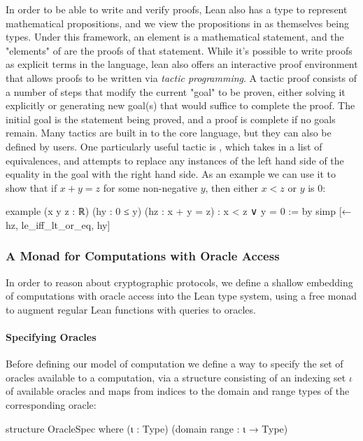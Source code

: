 In order to be able to write and verify proofs, Lean also has a type  to represent mathematical propositions, and we view the propositions in  as themselves being types.
Under this framework, an element  is a mathematical statement, and the "elements" of  are the proofs of that statement.  While it's possible to write proofs as explicit terms in the language, lean also offers an interactive proof environment that allows proofs to be written via \textit{tactic programming}.
A tactic proof consists of a number of steps that modify the current "goal" to be proven, either solving it explicitly or generating new goal(s) that would suffice to complete the proof.
The initial goal is the statement being proved, and a proof is complete if no goals remain.
Many tactics are built in to the core language, but they can also be defined by users.
One particularly useful tactic is , which takes in a list of equivalences, and attempts to replace any instances of the left hand side of the equality in the goal with the right hand side. 
As an example we can use it to show that if $x + y = z$ for some non-negative $y$, then either $x < z$ or $y$ is $0$:

\begin{leancode}
  example (x y z : ℝ) (hy : 0 ≤ y)
      (hz : x + y = z) : x < z ∨ y = 0 :=
    by simp [← hz, le_iff_lt_or_eq, hy]
\end{leancode}

\subsubsection{A Monad for Computations with Oracle Access} \label{OracleComp}
In order to reason about cryptographic protocols, we define a shallow embedding of computations with oracle access into the Lean type system, using a free monad to augment regular Lean functions with queries to oracles.

\paragraph{Specifying Oracles}
Before defining our model of computation we define a way to specify the set of oracles available to a computation, via a structure  consisting of an indexing set $\iota$ of available oracles and maps from indices to the domain and range types of the corresponding oracle:
\begin{leancode}
  structure OracleSpec where (ι : Type) (domain range : ι → Type)
\end{leancode}


